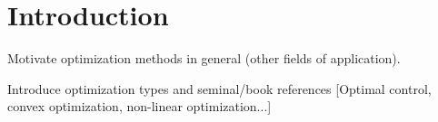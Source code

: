 
\section{Introduction}\label{sec:1}

Motivate optimization methods in general (other fields of application).

Introduce optimization types and seminal/book references [Optimal control, convex optimization, non-linear optimization...]